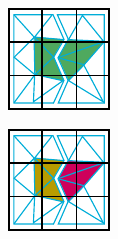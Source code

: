 \begin{figure}[!h]
\begin{subfigure}[b]{0.20\linewidth}
		\includegraphics[width=\linewidth]{images/cutting-mig2015/buildNMG_2.pdf}
		\caption{\label{fig:buildNMG2}}
	\end{subfigure}
	\hfill
	\begin{subfigure}[b]{0.20\linewidth}
		\centering
		\includegraphics[width=\linewidth]{images/cutting-mig2015/buildNMG_3.pdf}

\end{subfigure}
\end{figure}
